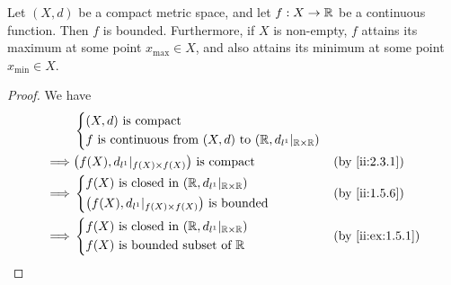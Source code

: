 \begin{prop}\label{ii:2.3.2}
  Let \((X, d)\) be a compact metric space, and let \(f : X \to \mathbb{R}\) be a continuous function.
  Then \(f\) is bounded.
  Furthermore, if \(X\) is non-empty, \(f\) attains its maximum at some point \(x_{\max} \in X\), and also attains its minimum at some point \(x_{\min} \in X\).
\end{prop}

\begin{proof}
  We have
  \begin{align*}
             & \begin{dcases}
                 (X, d) \text{ is compact} \\
                 f \text{ is continuous from } (X, d) \text{ to } (\R, d_{l^1}|_{\R \times \R})
               \end{dcases}                     \\
    \implies & \big(f(X), d_{l^1}|_{f(X) \times f(X)}\big) \text{ is compact}                 &  & \by{ii:2.3.1} \\
    \implies & \begin{dcases}
                 f(X) \text{ is closed in } (\R, d_{l^1}|_{\R \times \R}) \\
                 \big(f(X), d_{l^1}|_{f(X) \times f(X)}\big) \text{ is bounded}
               \end{dcases}                 &  & \by{ii:1.5.6}                                     \\
    \implies & \begin{dcases}
                 f(X) \text{ is closed in } (\R, d_{l^1}|_{\R \times \R}) \\
                 f(X) \text{ is bounded subset of } \R
               \end{dcases}                    &  & \by{ii:ex:1.5.1}
  \end{align*}


\end{proof}
